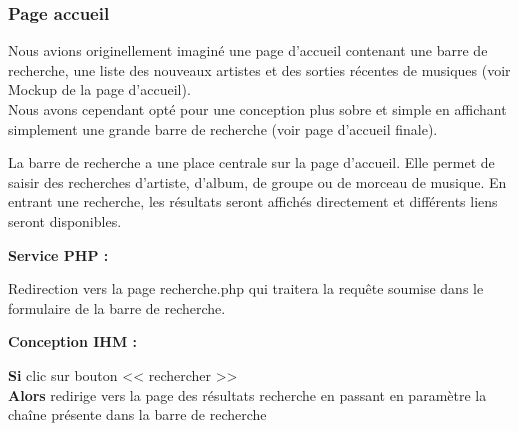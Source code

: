 		\subsubsection{Page accueil}

            \begin{paragraphe}
                Nous avions originellement imaginé une page d'accueil contenant une barre de recherche, une liste des nouveaux artistes et des sorties récentes de musiques (voir Mockup de la page d'accueil).\\
                Nous avons cependant opté pour une conception plus sobre et simple en affichant simplement une grande barre de recherche (voir page d'accueil finale).
            \end{paragraphe}

			\begin{paragraphe}
                La barre de recherche a une place centrale sur la page d'accueil. Elle permet de saisir des recherches d’artiste, d’album, de groupe ou de morceau de musique.
				En entrant une recherche, les résultats seront affichés directement et différents liens seront disponibles.
			\end{paragraphe}

			\begin{paragraphe}
				\textbf{Service PHP :}
            \end{paragraphe}

            \begin{paragraphe}
                Redirection vers la page recherche.php qui traitera la requête soumise dans le formulaire de la barre de recherche.
			\end{paragraphe}

			\begin{paragraphe}
				\textbf{Conception IHM :}
            \end{paragraphe}


            \begin{paragraphe}
                \textbf{Si} clic sur bouton << rechercher >> \\
                \textbf{Alors} redirige vers la page des résultats recherche en passant en paramètre la chaîne présente dans la barre de recherche
            \end{paragraphe}

